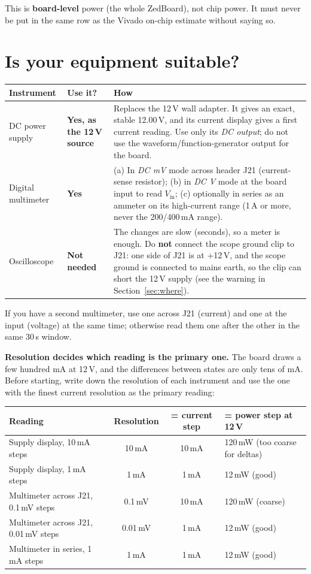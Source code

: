 \documentclass[11pt,a4paper]{article}
\begin{document}
This is \textbf{board-level} power (the whole ZedBoard), not chip power. It must never be put in the same row as the Vivado on-chip estimate without saying so.

\section{Is your equipment suitable?}\label{sec:equip}

\begin{tabularx}{\textwidth}{@{}p{}p{}L@{}}
\toprule
\textbf{Instrument} & \textbf{Use it?} & \textbf{How} \\ \midrule
DC power supply & \textbf{Yes, as the 12\,V source} & Replaces the 12\,V wall adapter. It gives an exact, stable 12.00\,V, and its current display gives a first current reading. Use only its \emph{DC output}; do not use the waveform/function-generator output for the board. \\
Digital multimeter & \textbf{Yes} & (a) In \emph{DC mV} mode across header J21 (current-sense resistor); (b) in \emph{DC V} mode at the board input to read $V_\mathrm{in}$; (c) optionally in series as an ammeter on its high-current range (1\,A or more, never the 200/400\,mA range). \\
Oscilloscope & \textbf{Not needed} & The changes are slow (seconds), so a meter is enough. Do \textbf{not} connect the scope ground clip to J21: one side of J21 is at +12\,V, and the scope ground is connected to mains earth, so the clip can short the 12\,V supply (see the warning in Section~\ref{sec:where}). \\
\bottomrule
\end{tabularx}

\medskip
If you have a second multimeter, use one across J21 (current) and one at the input (voltage) at the same time; otherwise read them one after the other in the same 30\,s window.

\textbf{Resolution decides which reading is the primary one.} The board draws a few hundred mA at 12\,V, and the differences between states are only tens of mA. Before starting, write down the resolution of each instrument and use the one with the finest current resolution as the primary reading:

\begin{tabularx}{\textwidth}{@{}lccL@{}}
\toprule
\textbf{Reading} & \textbf{Resolution} & \textbf{= current step} & \textbf{= power step at 12\,V} \\ \midrule
Supply display, 10\,mA steps & 10\,mA & 10\,mA & 120\,mW (too coarse for deltas) \\
Supply display, 1\,mA steps & 1\,mA & 1\,mA & 12\,mW (good) \\
Multimeter across J21, 0.1\,mV steps & 0.1\,mV & 10\,mA & 120\,mW (coarse) \\
Multimeter across J21, 0.01\,mV steps & 0.01\,mV & 1\,mA & 12\,mW (good) \\
Multimeter in series, 1\,mA steps & 1\,mA & 1\,mA & 12\,mW (good) \\
\bottomrule
\end{tabularx}
\end{document}
